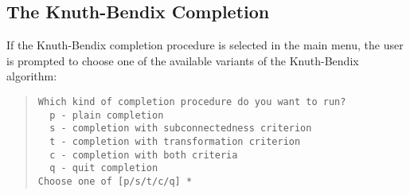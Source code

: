 \subsection{The Knuth-Bendix Completion}
\label{KBCompletion}

If the Knuth-Bendix completion procedure is selected in the main
menu, the user is prompted to choose one of the available variants 
of the Knuth-Bendix algorithm:
\begin{quote}
\begin{verbatim}
Which kind of completion procedure do you want to run?
  p - plain completion
  s - completion with subconnectedness criterion
  t - completion with transformation criterion
  c - completion with both criteria
  q - quit completion
Choose one of [p/s/t/c/q] *
\end{verbatim}
\end{quote}

